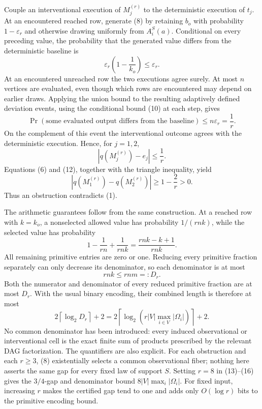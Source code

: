 Couple an interventional execution of \(M_j^{(r)}\) to the deterministic execution of \(t_j\).  At an encountered reached row, generate (8) by retaining \(b_o\) with probability \(1-\varepsilon_r\) and otherwise drawing uniformly from \(A_i^S(a)\).  Conditional on every preceding value, the probability that the generated value differs from the deterministic baseline is
\[
 \varepsilon_r\left(1-\frac{1}{k_o}\right)\leq\varepsilon_r.
 \tag{10}
\]
At an encountered unreached row the two executions agree surely.  At most \(n\) vertices are evaluated, even though which rows are encountered may depend on earlier draws.  Applying the union bound to the resulting adaptively defined deviation events, using the conditional bound (10) at each step, gives
\[
 \Pr(\text{some evaluated output differs from the baseline})
 \leq n\varepsilon_r=\frac1r.
 \tag{11}
\]
On the complement of this event the interventional outcome agrees with the deterministic execution.  Hence, for \(j=1,2\),
\[
 |q(M_j^{(r)})-e_j|\leq\frac1r.
 \tag{12}
\]
Equations (6) and (12), together with the triangle inequality, yield
\[
 |q(M_1^{(r)})-q(M_2^{(r)})|
 \geq 1-\frac2r>0.
 \tag{13}
\]
Thus an obstruction contradicts (1).

The arithmetic guarantees follow from the same construction.  At a reached row with \(k=k_o\), a nonselected allowed value has probability \(1/(rnk)\), while the selected value has probability
\[
 1-\frac1{rn}+\frac1{rnk}
 =\frac{rnk-k+1}{rnk}.
 \tag{14}
\]
All remaining primitive entries are zero or one.  Reducing every primitive fraction separately can only decrease its denominator, so each denominator is at most
\[
 rnk\leq rnm=:D_r.
 \tag{15}
\]
Both the numerator and denominator of every reduced primitive fraction are at most \(D_r\).  With the usual binary encoding, their combined length is therefore at most
\[
 2\left\lceil\log_2D_r\right\rceil+2
 =2\left\lceil\log_2\!\left(r|V|\max_{i\in V}|\Omega_i|\right)\right\rceil+2.
 \tag{16}
\]
No common denominator has been introduced: every induced observational or interventional cell is the exact finite sum of products prescribed by the relevant DAG factorization.  The quantifiers are also explicit.  For each obstruction and each \(r\geq3\), (8) existentially selects a common observational fiber; nothing here asserts the same gap for every fixed law of support \(S\).  Setting \(r=8\) in (13)--(16) gives the \(3/4\)-gap and denominator bound \(8|V|\max_i|\Omega_i|\).  For fixed input, increasing \(r\) makes the certified gap tend to one and adds only \(O(\log r)\) bits to the primitive encoding bound.

